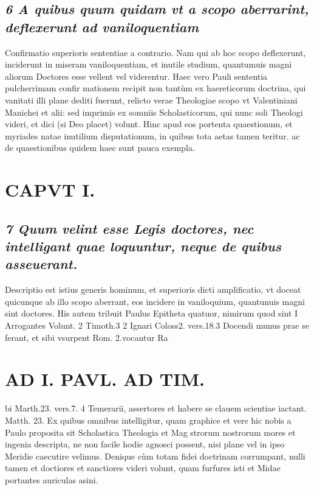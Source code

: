 \documentclass{article}
\begin{document}
\begin{pages}
\subsection*{\textit{6 A quibus quum quidam vt a scopo aberrarint, deflexerunt ad vaniloquentiam }}\pstart Confirmatio superioris sententiae a contrario. Nam qui ab hoc scopo deflexerunt, inciderunt in miseram vaniloquentiam, et inutile studium, quantumuis magni aliorum Doctores esse vellent vel viderentur. Haec vero Pauli sententia pulcherrimam confir mationem recipit non tantùm ex haereticorum doctrina, qui vanitati illi plane dediti fuerunt, relicto verae Theologiae scopo vt Valentiniani Manichei et alii: sed imprimis ex somniis Scholasticorum, qui nunc soli Theologi videri, et dici (si Deo placet) volunt. Hinc apud eos portenta quaestionum, et myriades natae inutilium disputationum, in quibus tota aetas tamen teritur. ac de quaestionibus quidem haec sunt pauca exempla.  \pend
\section*{CAPVT I. }
\marginpar{[ p.17 ]}
{}
\subsection*{\textit{7 Quum velint esse Legis doctores, nec intelligant quae loquuntur, neque de quibus asseuerant. }}\pstart Descriptio est istius generis hominum, et superioris dicti amplificatio, vt doceat quicunque ab illo scopo aberrant, eos incidere in vaniloquium, quantunuis magni sint doctores. His autem tribuit Paulus Epitheta quatuor, nimirum quod sint I Arrogantes Volunt. 2 Timoth.3 2 Ignari Coloss2. vers.18.3 Docendi munus prae se ferant, et sibi vsurpent Rom. 2.vocantur Ra  \pend
\section*{AD I. PAVL. AD TIM. }
\marginpar{[ p.18 ]}\pstart bi Marth.23. vers.7. 4 Temerarii, assertores et habere se clauem scientiae iactant. Matth. 23. Ex quibus omnibus intelligitur, quam graphice et vere hic nobis a Paulo proposita sit Scholastica Theologia et Mag strorum nostrorum mores et ingenia descripta, ne non facile hodie agnosci possent, nisi plane vel in ipso Meridie caecutire velimus. Denique cùm totam fidei doctrinam corrumpant, nulli tamen et doctiores et sanctiores videri volunt, quam furfures isti et Midae portantes auriculas asini.  \pend
{}
{}

\end{pages}
\end{document}
